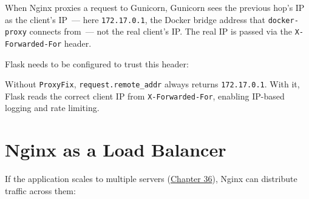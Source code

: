 When Nginx proxies a request to Gunicorn, Gunicorn sees the previous hop's IP as the client's IP~--- here \texttt{172.17.0.1}, the Docker bridge address that \texttt{docker-proxy} connects from~--- not the real client's IP. The real IP is passed via the \texttt{X-Forwarded-For} header.

Flask needs to be configured to trust this header:

\begin{codebox}[short]

\begin{Shaded}
\begin{Highlighting}[]

\OperatorTok{{-}\textgreater{}}
\OperatorTok{=}\NormalTok{)}
\OperatorTok{=}\OperatorTok{=}\OperatorTok{=}\NormalTok{)}
\end{Highlighting}
\end{Shaded}

\end{codebox}

\noindent{}Without \texttt{ProxyFix}, \texttt{request.remote\_addr} always returns \texttt{172.17.0.1}. With it, Flask reads the correct client IP from \texttt{X-Forwarded-For}, enabling IP-based logging and rate limiting.

\setcounter{section}{7}
\section{Nginx as a Load Balancer}\label{28-traffic-routing:288-nginx-as-a-load-balancer}

If the application scales to multiple servers (\hyperref[ch:36-scaling-load]{Chapter 36}), Nginx can distribute traffic across them:

